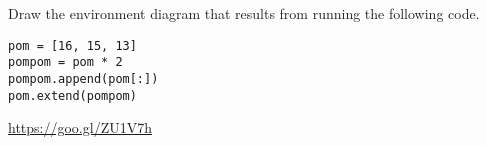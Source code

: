 \begin{blocksection}
\question Draw the environment diagram that results from running the following code.

\begin{lstlisting}
pom = [16, 15, 13]
pompom = pom * 2
pompom.append(pom[:])
pom.extend(pompom)
\end{lstlisting}

\begin{solution}[1in]
\url{https://goo.gl/ZU1V7h}
\end{solution}
\end{blocksection}

